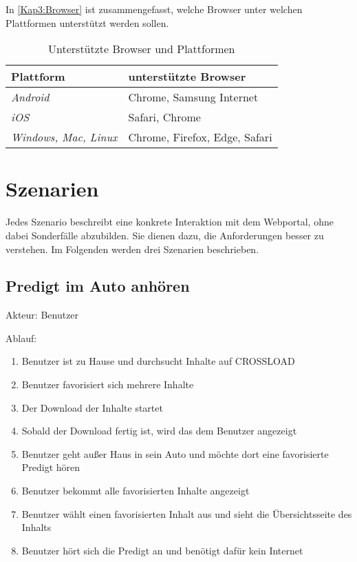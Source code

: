 In \autoref{Kap3:Browser} ist zusammengefasst, welche Browser unter welchen Plattformen unterstützt werden sollen.

\begin{table}
  \renewcommand{\arraystretch}{1.2}
  \centering
  \sffamily
  \begin{footnotesize}
    \begin{tabular}{l l}
      \toprule
      \textbf{Plattform} & \textbf{unterstützte Browser} \\
      \midrule
      \emph{Android} & Chrome, Samsung Internet \\
      \emph{iOS} & Safari, Chrome \\
      \emph{Windows, Mac, Linux} & Chrome, Firefox, Edge, Safari \\
      \bottomrule
    \end{tabular}
  \end{footnotesize}
  \rmfamily
  \caption{Unterstützte Browser und Plattformen}
  \label{Kap3:Browser}
\end{table}

\section{Szenarien}
\label{Kap3:Szenarien}
Jedes Szenario beschreibt eine konkrete Interaktion mit dem Webportal, ohne dabei Sonderfälle abzubilden. Sie dienen dazu, die Anforderungen besser zu verstehen. Im Folgenden werden drei Szenarien beschrieben.

\subsection{Predigt im Auto anhören}
Akteur: Benutzer

Ablauf:
\begin{enumerate}
	\item Benutzer ist zu Hause und durchsucht Inhalte auf CROSSLOAD
	\item Benutzer favorisiert sich mehrere Inhalte
	\item Der Download der Inhalte startet
	\item Sobald der Download fertig ist, wird das dem Benutzer angezeigt
	\item Benutzer geht außer Haus in sein Auto und möchte dort eine favorisierte Predigt hören
	\item Benutzer bekommt alle favorisierten Inhalte angezeigt
	\item Benutzer wählt einen favorisierten Inhalt aus und sieht die Übersichtsseite des Inhalts
	\item Benutzer hört sich die Predigt an und benötigt dafür kein Internet
\end{enumerate}

